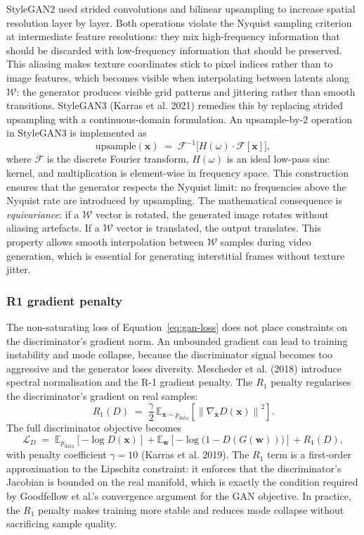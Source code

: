 \documentclass{article}
\begin{document}
StyleGAN2 used strided convolutions and bilinear upsampling to increase spatial resolution layer by layer. Both operations violate the Nyquist sampling criterion at intermediate feature resolutions: they mix high-frequency information that should be discarded with low-frequency information that should be preserved. This aliasing makes texture coordinates stick to pixel indices rather than to image features, which becomes visible when interpolating between latents along $\mathcal{W}$: the generator produces visible grid patterns and jittering rather than smooth transitions. StyleGAN3 (Karras et al. 2021) remedies this by replacing strided upsampling with a continuous-domain formulation. An upsample-by-2 operation in StyleGAN3 is implemented as
$$\text{upsample}(\mathbf{x}) \;=\; \mathcal{F}^{-1}\!\bigl[H(\omega) \cdot \mathcal{F}[\mathbf{x}]\bigr],$$
where $\mathcal{F}$ is the discrete Fourier transform, $H(\omega)$ is an ideal low-pass sinc kernel, and multiplication is element-wise in frequency space. This construction ensures that the generator respects the Nyquist limit: no frequencies above the Nyquist rate are introduced by upsampling. The mathematical consequence is \emph{equivariance}: if a $\mathcal{W}$ vector is rotated, the generated image rotates without aliasing artefacts. If a $\mathcal{W}$ vector is translated, the output translates. This property allows smooth interpolation between $\mathcal{W}$ samples during video generation, which is essential for generating interstitial frames without texture jitter.

\subsubsection*{R1 gradient penalty}

The non-saturating loss of Equation~\ref{eq:gan-loss} does not place constraints on the discriminator's gradient norm. An unbounded gradient can lead to training instability and mode collapse, because the discriminator signal becomes too aggressive and the generator loses diversity. Mescheder et al. (2018) introduce spectral normalisation and the R-1 gradient penalty. The $R_1$ penalty regularises the discriminator's gradient on real samples:
$$R_1(D) \;=\; \frac{\gamma}{2}\,\mathbb{E}_{\mathbf{x} \sim p_\text{data}}\!\left[\left\|\nabla_{\mathbf{x}} D(\mathbf{x})\right\|^2\right].$$
The full discriminator objective becomes
$$\mathcal{L}_D \;=\; \mathbb{E}_{p_\text{data}}\!\left[-\log D(\mathbf{x})\right] + \mathbb{E}_{\mathbf{w}}\!\left[-\log\!\bigl(1 - D(G(\mathbf{w}))\bigr)\right] + R_1(D),$$
with penalty coefficient $\gamma = 10$ (Karras et al. 2019). The $R_1$ term is a first-order approximation to the Lipschitz constraint: it enforces that the discriminator's Jacobian is bounded on the real manifold, which is exactly the condition required by Goodfellow et al.'s convergence argument for the GAN objective. In practice, the $R_1$ penalty makes training more stable and reduces mode collapse without sacrificing sample quality.
\end{document}
